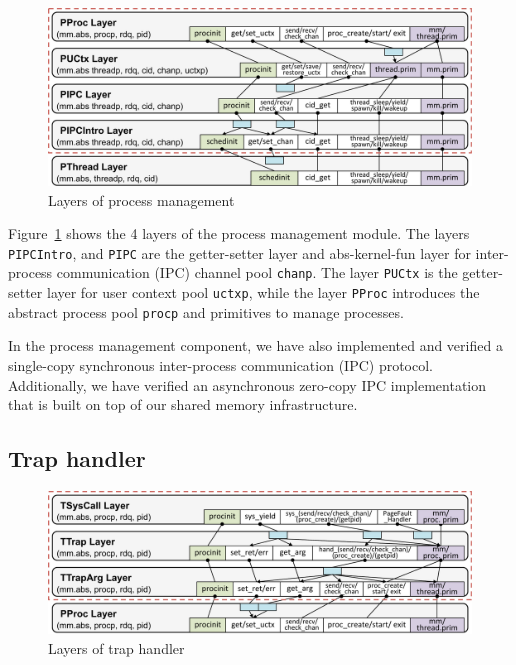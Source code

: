 {
\begin{figure}\centering
\includegraphics[scale=0.5]{figs/pm_layer}	
\caption{Layers of process management}
\label{fig:base:pm:layers}
\hrulefill
\end{figure}
}
 
Figure~\ref{fig:base:pm:layers} shows the 4 layers of the process
management module.  The layers \verb"PIPCIntro", and
\verb"PIPC" are the getter-setter layer and abs-kernel-fun layer for
inter-process communication (IPC) channel pool \verb"chanp".  The
layer \verb"PUCtx" is the getter-setter layer for user context pool
\verb"uctxp", while the layer \verb"PProc" introduces
the abstract process pool \verb"procp" and primitives to manage
processes.

In the process management component, we have also implemented and verified a single-copy
synchronous inter-process communication (IPC) protocol.
Additionally, we have verified an
asynchronous zero-copy IPC implementation that is built on top of our
shared memory infrastructure.


\subsection{Trap handler}
\label{sec:base:trap}

\begin{figure}[t]\centering
\includegraphics[scale=0.5]{figs/trap_layer_base}	
\caption{Layers of trap handler}
\label{fig:base:trap:layers}
\hrulefill
\end{figure}

